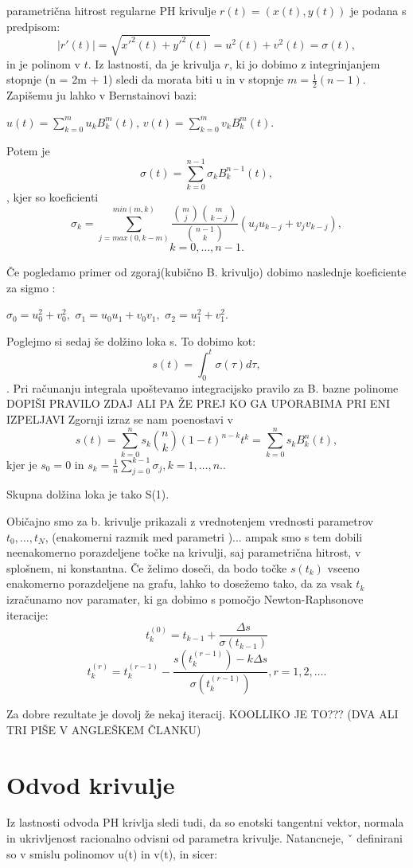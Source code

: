 \documentclass[12pt]{article}
\begin{document}
parametrična hitrost regularne PH krivulje $r(t) = (x(t), y(t))$ je podana s predpisom:
$$ | r\prime (t) | =\sqrt{x\prime^2(t)+y\prime^2(t)}= u^2 (t) + v^2 (t) = \sigma (t),$$
in je polinom v $t$. 
Iz lastnosti, da je krivulja $r$, ki jo dobimo z integrinjanjem stopnje (n = 2m + 1) sledi
da morata biti u in v stopnje  $m = \frac{1}{2}(n - 1)$. Zapišemu ju lahko v 
Bernstainovi bazi:

	$u (t)=\sum_{k=0}^m u_kB_k^m(t)$, 
	$v (t) =\sum_{k=0}^m v_kB_k^m(t).$

Potem je 
$$\sigma (t) =\sum_{k=0}^{n-1} \sigma_kB_k^{n-1}(t),$$, 
kjer so koeficienti 
$$\sigma_k =\sum_{j=max(0,k-m)}^{min(m,k)}\frac{\binom{m}{j}\binom{m}{k-j}}{\binom{n-1}{k}}(u_ju_{k-j}+v_jv_{k-j}),$$ $$k = 0,\ldots , n - 1.$$

Če pogledamo primer od zgoraj(kubično B. krivuljo) dobimo naslednje koeficiente za sigmo :

$\sigma_0 = u^2_0+ v^2_0, $
$\sigma_1 = u_0u_1 + v_0v_1,$ 
$\sigma_2 = u^2_1+ v^2_1.$

Poglejmo si sedaj še dolžino loka s.
To dobimo kot:
$$s (t) =\int^t_0\sigma(\tau) d\tau,$$.
Pri računanju integrala upoštevamo integracijsko pravilo za B. bazne polinome 
DOPIŠI PRAVILO ZDAJ ALI PA ŽE PREJ KO GA UPORABIMA PRI ENI IZPELJAVI
Zgornji izraz se nam poenostavi v 
$$s (t) =\sum^n_{k=0}s_k\binom{n}{k}(1-t)^{n-k}t^k=\sum_{k=0}^n s_kB^n_k(t),$$
	kjer je $s_0=0$ in $s_k=\frac{1}{n}\sum^{k-1}_{j=0}\sigma_j, k=1,\ldots,n.$.

Skupna dolžina loka je tako S(1). 

Običajno smo za  b. krivulje prikazali z vrednotenjem vrednosti parametrov  $t_0,\ldots , t_N$,
(enakomerni razmik med parametri )... 
ampak smo s tem dobili neenakomerno porazdeljene točke na krivulji, saj parametrična 
hitrost, v splošnem, ni konstantna.
Če želimo doseči, da bodo točke $s(t_k)$ vseeno enakomerno porazdeljene na grafu,
lahko to dosežemo tako, da za vsak $t_k$ izračunamo nov paramater, ki ga dobimo 
s pomočjo Newton-Raphsonove iteracije: 
$$t^{(0)}_k = t_{k-1}+\frac{\Delta s}{\sigma(t_{k-1})}$$
$$t^{(r)}_k = t^{(r-1)}_k-\frac{s(t^{(r-1)}_k)-k\Delta s}{\sigma(t^{(r-1)}_k)}, r = 1, 2,\ldots.$$

Za dobre rezultate je dovolj že nekaj iteracij. KOOLLIKO JE TO??? (DVA ALI TRI PIŠE V ANGLEŠKEM ČLANKU)

\section*{Odvod krivulje}
Iz lastnosti odvoda PH krivlja sledi tudi, da so enotski tangentni vektor,
normala in ukrivljenost racionalno odvisni od parametra krivulje. Natancneje, ˇ
definirani so v smislu polinomov u(t) in v(t), in sicer: 
\end{document}
